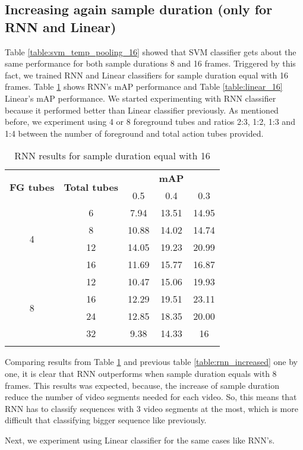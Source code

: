 \subsection{Increasing again sample duration (only for RNN and Linear)}

Table \ref{table:svm_temp_pooling_16} showed that SVM classifier gets about the same performance for both sample durations 8 and 16 frames.
Triggered by this fact, we trained RNN and Linear classifiers for sample duration equal with 16 frames. Table \ref{table:rnn_16} shows RNN's mAP
performance and Table \ref{table:linear_16} Linear's mAP performance. We started experimenting with RNN classifier because it performed better than
Linear classifier previously. As mentioned before, we experiment using 4 or 8 foreground tubes and ratios 2:3, 1:2, 1:3 and 1:4 between the number of
foreground and total action tubes provided.

\begin{center}
  \begin{longtable}{|| c | c || c c c ||}
    \hline
    \multirow{2}{*}{\textbf{FG tubes}} & \multirow{2}{*}{\textbf{Total tubes}} & {} & \textbf{mAP} & {} \\
    {} & {} & 0.5 & 0.4 & 0.3 \\
    \hline
    \multirow{4}{*}{4} & 6 & 7.94 & 13.51 & 14.95 \\
    \cline{2-5}
    {} & 8 & 10.88 & 14.02 & 14.74  \\
    \cline{2-5}
    {} & 12 & 14.05 & 19.23 & 20.99 \\
    \cline{2-5}
    {} & 16 & 11.69 & 15.77 & 16.87  \\
    \hline
    \multirow{4}{*}{8} & 12 & 10.47 & 15.06 & 19.93 \\
    \cline{2-5}
    {} & 16 &  12.29 & 19.51 & 23.11  \\
    \cline{2-5}
    {} & 24 & 12.85 & 18.35 & 20.00 \\
    \cline{2-5}
    {} & 32 & 9.38 & 14.33 & 16 \\
    \hline

  \caption{RNN results for sample duration equal with 16}
  \label{table:rnn_16}
\end{longtable}
\end{center}

Comparing results from Table \ref{table:rnn_16} and previous table \ref{table:rnn_increased} one by one, it is clear that RNN outperforms when sample
duration equals with 8 frames. This results was expected, because, the increase of sample duration reduce the number of video segments needed for each video.
So, this means that RNN has to classify sequences with 3 video segments at the most, which is more difficult that classifying bigger sequence like previously. \par
Next, we experiment using Linear classifier for the same cases like RNN's. 

